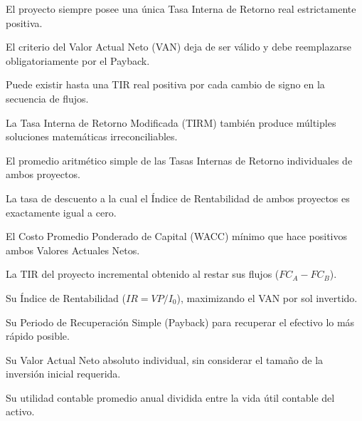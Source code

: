 \begin{opts}
    \item El proyecto siempre posee una única Tasa Interna de Retorno real estrictamente positiva.
    \item El criterio del Valor Actual Neto (VAN) deja de ser válido y debe reemplazarse obligatoriamente por el Payback.
    \item Puede existir hasta una TIR real positiva por cada cambio de signo en la secuencia de flujos.
    \item La Tasa Interna de Retorno Modificada (TIRM) también produce múltiples soluciones matemáticas irreconciliables.
\end{opts}

\begin{opts}
    \item El promedio aritmético simple de las Tasas Internas de Retorno individuales de ambos proyectos.
    \item La tasa de descuento a la cual el Índice de Rentabilidad de ambos proyectos es exactamente igual a cero.
    \item El Costo Promedio Ponderado de Capital (WACC) mínimo que hace positivos ambos Valores Actuales Netos.
    \item La TIR del proyecto incremental obtenido al restar sus flujos ($FC_A - FC_B$).
\end{opts}

\begin{opts}
    \item Su Índice de Rentabilidad ($IR = VP/I_0$), maximizando el VAN por sol invertido.
    \item Su Periodo de Recuperación Simple (Payback) para recuperar el efectivo lo más rápido posible.
    \item Su Valor Actual Neto absoluto individual, sin considerar el tamaño de la inversión inicial requerida.
    \item Su utilidad contable promedio anual dividida entre la vida útil contable del activo.
\end{opts}

